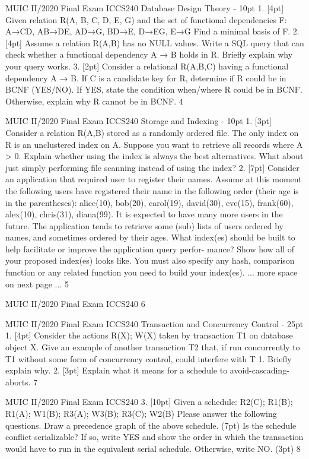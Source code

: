 \documentclass[a4paper, 11pt]{article}
\begin{document}
MUIC II/2020 Final Exam ICCS240
Database Design Theory - 10pt
1. [4pt] Given relation R(A, B, C, D, E, G) and the set of functional dependencies F: A→CD, AB→DE, AD→G, BD→E, D→EG, E→G
Find a minimal basis of F.
     2. [4pt] Assume a relation R(A,B) has no NULL values. Write a SQL query that can check whether a functional dependency A → B holds in R. Briefly explain why your query works.
    3. [2pt] Consider a relational R(A,B,C) having a functional dependency A → B. If C is a candidate key for R, determine if R could be in BCNF (YES/NO). If YES, state the condition when/where R could be in BCNF. Otherwise, explain why R cannot be in BCNF.
    4

MUIC II/2020 Final Exam ICCS240
Storage and Indexing - 10pt
1. [3pt] Consider a relation R(A,B) stored as a randomly ordered file. The only index on R is an unclustered index on A. Suppose you want to retrieve all records where A > 0. Explain whether using the index is always the best alternatives. What about just simply performing file scanning instead of using the index?
     2. [7pt] Consider an application that required user to register their names. Assume at this moment the following users have registered their name in the following order (their age is in the parentheses):
alice(10), bob(20), carol(19), david(30), eve(15), frank(60), alex(10), chris(31), diana(99). It is expected to have many more users in the future. The application tends to retrieve some
(sub) lists of users ordered by names, and sometimes ordered by their ages.
What index(es) should be built to help facilitate or improve the application query perfor- mance? Show how all of your proposed index(es) looks like. You must also specify any hash, comparison function or any related function you need to build your index(es).
    ... more space on next page ...
5

MUIC II/2020 Final Exam ICCS240
     6

MUIC II/2020 Final Exam ICCS240
Transaction and Concurrency Control - 25pt
1. [4pt] Consider the actions R(X); W(X) taken by transaction T1 on database object X. Give an example of another transaction T2 that, if run concurrently to T1 without some form of concurrency control, could interfere with T 1. Briefly explain why.
     2. [3pt] Explain what it means for a schedule to avoid-cascading-aborts.
    7

MUIC II/2020 Final Exam ICCS240
3. [10pt] Given a schedule:
                R2(C); R1(B); R1(A); W1(B); R3(A); W3(B); R3(C); W2(B)
Please answer the following questions.
Draw a precedence graph of the above schedule. (7pt)
     Is the schedule conflict serializable? If so, write YES and show the order in which the transaction would have to run in the equivalent serial schedule. Otherwise, write NO. (3pt)
    8
\end{document}
